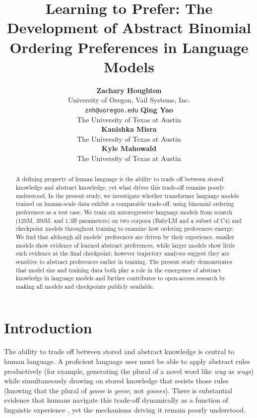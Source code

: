 \documentclass{article}
\title{Learning to Prefer: The Development of Abstract Binomial Ordering
Preferences in Language Models}
\author{
  \textbf{Zachary Houghton} \\
      University of Oregon, Vail Systems, Inc. \\
        \texttt{znh@uoregon.edu}
     \And
  \textbf{Qing Yao} \\
      The University of Texas at Austin \\
       \And
  \textbf{Kanishka Misra} \\
      The University of Texas at Austin \\
       \And
  \textbf{Kyle Mahowald} \\
      The University of Texas at Austin \\
      }
\begin{document}
\ifcolmsubmission
\linenumbers
\fi

\maketitle

\begin{abstract}
A defining property of human language is the ability to trade off
between stored knowledge and abstract knowledge, yet what drives this
trade-off remains poorly understood. In the present study, we
investigate whether transformer language models trained on human-scale
data exhibit a comparable trade-off, using binomial ordering preferences
as a test case. We train six autoregressive language models from scratch
(125M, 350M, and 1.3B parameters) on two corpora (BabyLM and a subset of
C4) and checkpoint models throughout training to examine how ordering
preferences emerge. We find that although all models' preferences are
driven by their experience, smaller models show evidence of learned
abstract preferences, while larger models show little such evidence at
the final checkpoint; however trajectory analyses suggest they are
sensitive to abstract preferences earlier in training. The present study
demonstrates that model size and training data both play a role in the
emergence of abstract knowledge in language models and further
contributes to open-access research by making all models and checkpoints
publicly available.
\end{abstract}

\section{Introduction}\label{introduction}

The ability to trade off between stored and abstract knowledge is
central to human language. A proficient language user must be able to
apply abstract rules productively (for example, generating the plural of
a novel word like \emph{wug} as \emph{wugs}) while simultaneously
drawing on stored knowledge that resists those rules (knowing that the
plural of \emph{goose} is \emph{geese}, not \emph{gooses}). There is
substantial evidence that humans navigate this trade-off dynamically as
a function of linguistic experience
\citep[e.g.,][]{morgan2016abstractknowledgedirect, morgan2024productiveknowledgeitemspecific, houghton2025multiwordrepresentationsminds},
yet the mechanisms driving it remain poorly understood.
\end{document}
